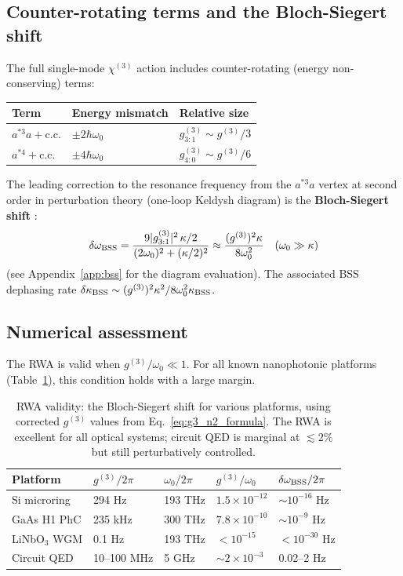 \documentclass[12pt]{article}
\newcommand{\BSS}{{\rm BSS}}
\begin{document}
\subsection{Counter-rotating terms and the Bloch-Siegert shift}

The full single-mode $\chi^{(3)}$ action includes counter-rotating
(energy non-conserving) terms:

\begin{center}
\begin{tabular}{lll}
\hline
Term & Energy mismatch & Relative size\\
\hline
$a^{*3}a+\mathrm{c.c.}$ & $\pm 2\hbar\omega_0$ &
$g^{(3)}_{3:1}\sim g^{(3)}/3$\\
$a^{*4}+\mathrm{c.c.}$ & $\pm 4\hbar\omega_0$ &
$g^{(3)}_{4:0}\sim g^{(3)}/6$\\
\hline
\end{tabular}
\end{center}

The leading correction to the resonance frequency from the $a^{*3}a$
vertex at second order in perturbation theory (one-loop Keldysh diagram)
is the \textbf{Bloch-Siegert shift} \cite{Bloch1940,Beaudoin2011}:
\begin{equation}
  \delta\omega_\BSS =
  \frac{9|g^{(3)}_{3:1}|^2\,\kappa/2}{(2\omega_0)^2+(\kappa/2)^2}
  \approx \frac{(g^{(3)})^2\kappa}{8\omega_0^2}
  \quad(\omega_0\gg\kappa)
  \label{eq:bss}
\end{equation}
(see Appendix~\ref{app:bss} for the diagram evaluation).  The associated
BSS dephasing rate $\delta\kappa_\BSS\sim(g^{(3)})^2\kappa^2/8\omega_0^2\kappa_\BSS$.

\subsection{Numerical assessment}

The RWA is valid when $g^{(3)}/\omega_0\ll 1$.  For all known nanophotonic
platforms (Table~\ref{tab:rwa}), this condition holds with a large margin.

\begin{table}[h]
\centering
\begin{tabular}{lllll}
\hline
Platform & $g^{(3)}/2\pi$ & $\omega_0/2\pi$ &
$g^{(3)}/\omega_0$ & $\delta\omega_\BSS/2\pi$\\
\hline
Si microring & 294 Hz & 193 THz & $1.5\times10^{-12}$ & $\sim10^{-16}$ Hz\\
GaAs H1 PhC & 235 kHz & 300 THz & $7.8\times10^{-10}$ & $\sim10^{-9}$ Hz\\
LiNbO$_3$ WGM & 0.1 Hz & 193 THz & $<10^{-15}$ & $<10^{-30}$ Hz\\
Circuit QED & 10--100 MHz & 5 GHz & $\sim2\times10^{-3}$ & 0.02--2 Hz\\
\hline
\end{tabular}
\caption{RWA validity: the Bloch-Siegert shift for various platforms,
using corrected $g^{(3)}$ values from Eq.~\eqref{eq:g3_n2_formula}.
The RWA is excellent for all optical systems; circuit QED is marginal
at $\lesssim 2\%$ but still perturbatively controlled.}
\label{tab:rwa}
\end{table}
\end{document}

